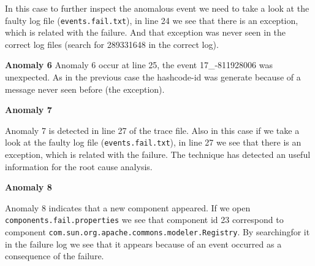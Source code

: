 In this case to further inspect the anomalous event we need to take a
look at the faulty log
file (\texttt{events.fail.txt}), in line 24 we see that there is an
exception, which is related with the failure. And that exception was
never seen in the correct log files (search for 289331648 in the
correct log).


\textbf{Anomaly 6} 
Anomaly 6 occur at line 25, the event 17\_-811928006 was unexpected.
As in the previous case the hashcode-id was generate because of a
message never seen before (the exception).

\textbf{Anomaly 7} 

Anomaly 7 is detected in line 27 of the trace file. Also in this case
if we take a look at the faulty log
file (\texttt{events.fail.txt}), in line 27 we see that there is an
exception, which is related with the failure. The technique has
detected an useful information for the root cause analysis.

\textbf{Anomaly 8} 

Anomaly 8 indicates that a new component appeared. If we open
\texttt{components.\-fail.\-properties} we see that component id 23
correspond to component
\texttt{com.sun.org.\-apache.commons.\-modeler.Registry}. By
searchingfor
it in the failure log we see that it appears because of an event
occurred as a consequence of the failure.



